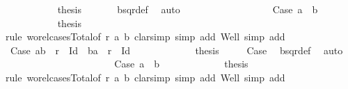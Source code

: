 \begin{isabellebody}
\ \ \ \ \ \ \ \ \ \isamarkupfalse%
\ {\isacharquery}{\kern0pt}thesis\ \isamarkupfalse%
\ {}\ {}\ {}\ \isamarkupfalse%
\ bsqr{\isacharunderscore}{\kern0pt}def\ \isamarkupfalse%
\ auto\isanewline
\ \ \ \ \ \ \ \isamarkupfalse%
\isanewline
\ \ \ \ \ \ \ \ \ \isamarkupfalse%
\ Case{}{}{}{\isacharcolon}{\kern0pt}\ {\isachardoublequoteopen}a{}\ {\isacharequal}{\kern0pt}\ b{}{\isachardoublequoteclose}\isanewline
\ \ \ \ \ \ \ \ \ \isamarkupfalse%
\ {\isacharquery}{\kern0pt}thesis\isanewline
\ \ \ \ \ \ \ \ \ \isamarkupfalse%
{\isacharparenleft}{\kern0pt}rule\ wo{\isacharunderscore}{\kern0pt}rel{\isachardot}{\kern0pt}cases{\isacharunderscore}{\kern0pt}Total{}{\isacharbrackleft}{\kern0pt}of\ r\ a{}\ b{}{\isacharbrackright}{\kern0pt}{\isacharcomma}{\kern0pt}\ clarsimp\ simp\ add{\isacharcolon}{\kern0pt}\ Well{\isacharcomma}{\kern0pt}\ simp\ add{\isacharcolon}{\kern0pt}\ {}{\isacharparenright}{\kern0pt}\isanewline
\ \ \ \ \ \ \ \ \ \ \ \isamarkupfalse%
\ Case{}{}{}{}{\isacharcolon}{\kern0pt}\ {\isachardoublequoteopen}{\isacharparenleft}{\kern0pt}a{}{\isacharcomma}{\kern0pt}b{}{\isacharparenright}{\kern0pt}\ {\isasymin}\ r\ {\isacharminus}{\kern0pt}\ Id\ {\isasymor}\ {\isacharparenleft}{\kern0pt}b{}{\isacharcomma}{\kern0pt}a{}{\isacharparenright}{\kern0pt}\ {\isasymin}\ r\ {\isacharminus}{\kern0pt}\ Id{\isachardoublequoteclose}\isanewline
\ \ \ \ \ \ \ \ \ \ \ \isamarkupfalse%
\ {\isacharquery}{\kern0pt}thesis\ \isamarkupfalse%
\ {}\ {}\ {}\ Case{}{}{}\ \isamarkupfalse%
\ bsqr{\isacharunderscore}{\kern0pt}def\ \isamarkupfalse%
\ auto\isanewline
\ \ \ \ \ \ \ \ \ \isamarkupfalse%
\isanewline
\ \ \ \ \ \ \ \ \ \ \ \isamarkupfalse%
\ Case{}{}{}{}{\isacharcolon}{\kern0pt}\ {\isachardoublequoteopen}a{}\ {\isacharequal}{\kern0pt}\ b{}{\isachardoublequoteclose}\isanewline
\ \ \ \ \ \ \ \ \ \ \ \isamarkupfalse%
\ {\isacharquery}{\kern0pt}thesis\isanewline
\ \ \ \ \ \ \ \ \ \ \ \isamarkupfalse%
{\isacharparenleft}{\kern0pt}rule\ wo{\isacharunderscore}{\kern0pt}rel{\isachardot}{\kern0pt}cases{\isacharunderscore}{\kern0pt}Total{}{\isacharbrackleft}{\kern0pt}of\ r\ a{}\ b{}{\isacharbrackright}{\kern0pt}{\isacharcomma}{\kern0pt}\ clarsimp\ simp\ add{\isacharcolon}{\kern0pt}\ Well{\isacharcomma}{\kern0pt}\ simp\ add{\isacharcolon}{\kern0pt}\ {}{\isacharparenright}{\kern0pt}\isanewline

\end{isabellebody}
